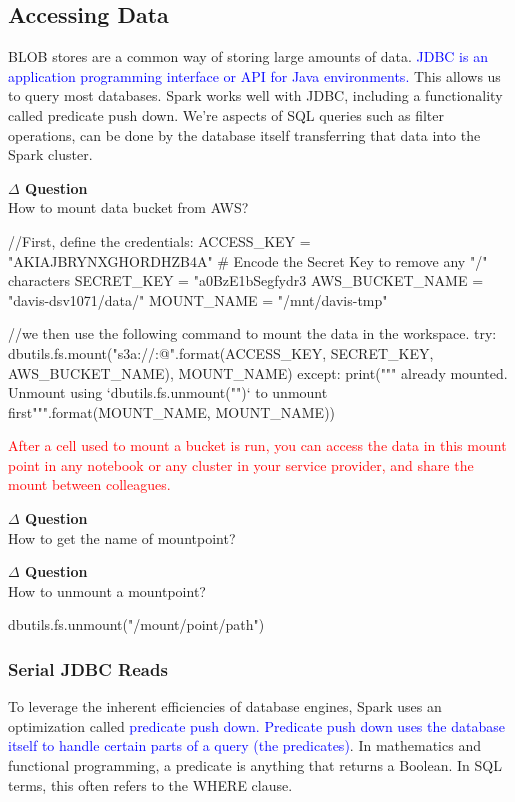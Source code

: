 \documentclass[12pt]{article}
\newenvironment{que}
    { \begin{mdframed}[backgroundcolor=green!20] \textbf{$\Delta$ Question} \\}
    {  \end{mdframed}}
\newcommand{\redp}[1]{\textcolor{red}{#1}}
\newcommand{\bluep}[1]{\textcolor{blue}{#1}}
\begin{document}
\subsection{Accessing Data}
BLOB stores are a common way of storing large amounts of data. \bluep{JDBC is an application programming interface or API for Java environments.} This allows us to query most databases. Spark works well with JDBC, including a functionality called predicate push down. We're aspects of SQL queries such as filter operations, can be done by the database itself transferring that data into the Spark cluster.
\begin{que}
How to mount data bucket from AWS?
\end{que}
\begin{code}
//First, define the credentials:
ACCESS_KEY = "AKIAJBRYNXGHORDHZB4A"
# Encode the Secret Key to remove any "/" characters
SECRET_KEY = "a0BzE1bSegfydr3%
AWS_BUCKET_NAME = "davis-dsv1071/data/"
MOUNT_NAME = "/mnt/davis-tmp"

//we then use the following command to mount the data in the workspace.
try:
  dbutils.fs.mount("s3a://{}:{}@{}".format(ACCESS_KEY, SECRET_KEY, AWS_BUCKET_NAME), MOUNT_NAME)
except:
  print("""{} already mounted. Unmount using `dbutils.fs.unmount("{}")` to unmount first""".format(MOUNT_NAME, MOUNT_NAME))
\end{code}
\redp{After a cell used to mount a bucket is run, you can access the data in this mount point in any notebook or any cluster in your service provider, and share the mount between colleagues.}
\begin{que}
How to get the name of mountpoint?
\end{que}
\begin{code}
\end{code}
\begin{que}
How to unmount a mountpoint?
\end{que}
\begin{code}
dbutils.fs.unmount("/mount/point/path")
\end{code}
\subsubsection{Serial JDBC Reads}
To leverage the inherent efficiencies of database engines, Spark uses an optimization called \bluep{predicate push down. Predicate push down uses the database itself to handle certain parts of a query (the predicates)}. In mathematics and functional programming, a predicate is anything that returns a Boolean. In SQL terms, this often refers to the WHERE clause. 
\end{document}
